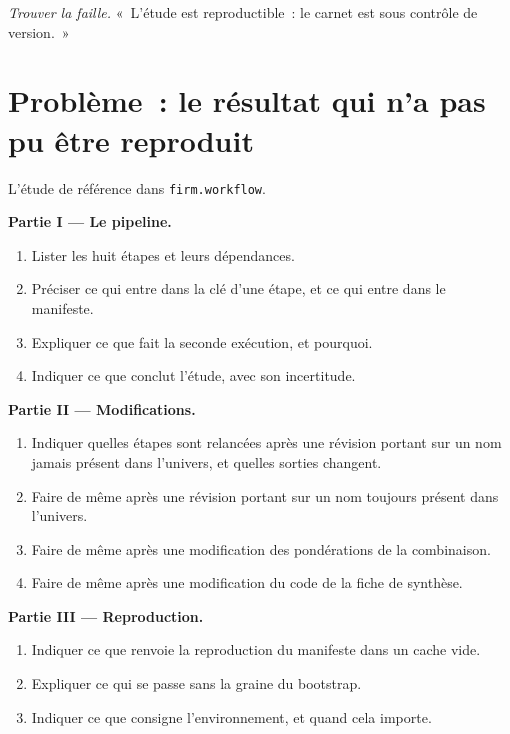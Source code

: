 \begin{exercise}[$\star\star\star$]\label{exo:rs:build-a-research-workflow:8}
\emph{Trouver la faille.} «~L'étude est reproductible~: le carnet est sous contrôle de version.~»
\end{exercise}

\section{Problème~: le résultat qui n'a pas pu être reproduit}

\begin{problem}\label{pb:rs:build-a-research-workflow:1}
L'étude de référence dans \texttt{firm.workflow}.

\medskip\noindent\textbf{Partie I --- Le pipeline.}
\begin{enumerate}
\item Lister les huit étapes et leurs dépendances.
\item Préciser ce qui entre dans la clé d'une étape, et ce qui entre dans le manifeste.
\item Expliquer ce que fait la seconde exécution, et pourquoi.
\item Indiquer ce que conclut l'étude, avec son incertitude.
\end{enumerate}

\medskip\noindent\textbf{Partie II --- Modifications.}
\begin{enumerate}[resume]
\item Indiquer quelles étapes sont relancées après une révision portant sur un nom jamais présent dans l'univers, et quelles sorties changent.
\item Faire de même après une révision portant sur un nom toujours présent dans l'univers.
\item Faire de même après une modification des pondérations de la combinaison.
\item Faire de même après une modification du code de la fiche de synthèse.
\end{enumerate}

\medskip\noindent\textbf{Partie III --- Reproduction.}
\begin{enumerate}[resume]
\item Indiquer ce que renvoie la reproduction du manifeste dans un cache vide.
\item Expliquer ce qui se passe sans la graine du bootstrap.
\item Indiquer ce que consigne l'environnement, et quand cela importe.
\end{enumerate}


\end{problem}
